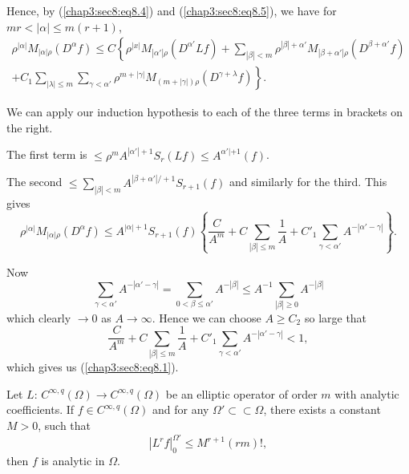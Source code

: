 Hence, by (\ref{chap3:sec8:eq8.4}) and (\ref{chap3:sec8:eq8.5}), we
have for $mr < | \alpha | \leq m(r+1)$, 
\begin{multline*}
  \rho^{|\alpha |} M_{|\alpha | \rho} (D^\alpha f) \leq C \left\{
  \rho^{|x|} M_{|\alpha '| \rho} (D^{\alpha '} Lf) + \sum_{|\beta | <
    m} \rho^{|\beta| + \alpha '} M_{|\beta + \alpha ' | \rho}
  (D^{\beta + \alpha '} f)\right.\\   
  \left.+ C_1 \sum_{| \lambda | \leq m}
  \sum_{\gamma < \alpha '} \rho^{m + | \gamma |} M_{(m + |\gamma |
    )\rho} (D^{\gamma + \lambda} f) \right\}. \tag{8.6}\label{chap3:sec8:eq8.6} 
\end{multline*}

We can apply our induction hypothesis to each of the three terms in
brackets on the right. 

The first term is $\leq \rho^m A^{|\alpha ' | + 1} S_r (L f) \leq
A^{\alpha ' | + 1} (f)$.  

The second $\leq \sum\limits_{|\beta | < m} A^{|\beta +  \alpha '|/+1}
 S_{r+1} (f)$ and similarly for the third. This gives 
$$
\rho^{|\alpha |} M_{|\alpha| \rho} (D^ \alpha f) \leq A^{|\alpha | +
  1} S_{r+1} (f) \left\{ \frac{C}{A^m} + C \sum_{|\beta | \leq m}
\frac{1}{A} + C'_1  \sum_{\gamma < \alpha '} A^{- |\alpha' - \gamma |}
\right\}. 
$$

Now\pageoriginale
$$
\sum_{\gamma < \alpha'} A^{-|\alpha ' - \gamma |} = \sum_{0 < \beta
  \leq \alpha '} A^{-|\beta |} \leq A^{-1} \sum_{|\beta |  \geq 0}
A^{-|\beta |}  
$$
which clearly $\to 0$ as $A \to \infty$. Hence we can choose $A \geq
C_2$ so large that 
$$
\frac{C}{A^m} + C \sum_{|\beta | \leq m} \frac{1}{A} + C'_1
\sum_{\gamma < \alpha '} A^{-|\alpha ' - \gamma |} < 1 , 
$$
which gives us (\ref{chap3:sec8:eq8.1}).

\setcounter{theorem}{0}
\begin{theorem}\label{chap3:sec8:thm1} %
  Let $L$: $C^{\infty, q} (\Omega ) \to C^{\infty, q} (\Omega )$ be an
  elliptic operator of order $m$ with analytic coefficients. If $f \in
  C^{\infty , q} (\Omega )$ and for any $\Omega ' \subset \subset
  \Omega$, there exists a constant $M > 0$, such that 
  $$
  |L^r f |^{\Omega'}_0 \leq M^{r+1} (rm) ! ,
  $$
  then $f$ is analytic in $\Omega$.
\end{theorem}

